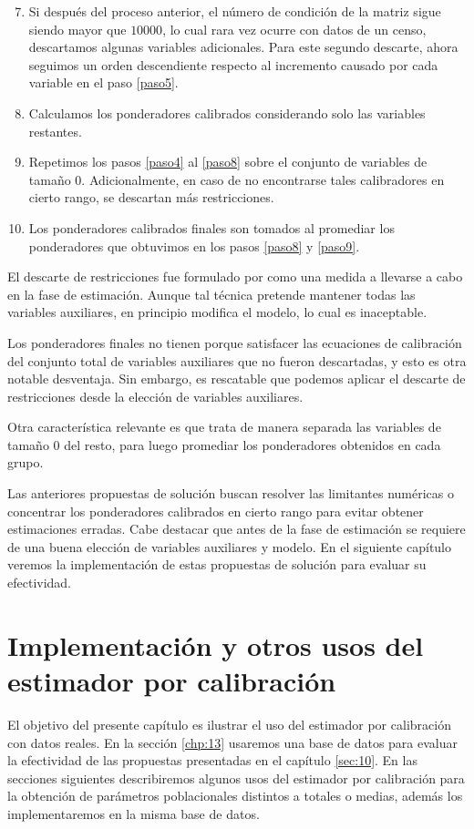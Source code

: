 \documentclass[a4paper,twoside,openright,12pt]{book}
\theoremstyle{definition}
\numberwithin{equation}{chapter}
\numberwithin{figure}{chapter}
\numberwithin{table}{chapter}
\numberwithin{theorem}{chapter}
\numberwithin{lemma}{chapter}
\begin{document}
\begin{enumerate}
\setcounter{enumi}{6}
	\item Si después del proceso anterior, el número de condición de la matriz sigue siendo mayor que $10000$, lo cual rara vez ocurre con datos de un censo, descartamos algunas variables adicionales. Para este segundo descarte, ahora seguimos un orden descendiente respecto al incremento causado por cada variable en el paso \ref{paso5}.
	\item\label{paso8} Calculamos los ponderadores calibrados considerando solo las variables restantes.
	\item\label{paso9} Repetimos los pasos \ref{paso4} al \ref{paso8} sobre el conjunto de variables de tamaño $0$. Adicionalmente, en caso de no encontrarse tales calibradores en cierto rango, se descartan más restricciones.
	\item Los ponderadores calibrados finales son tomados al promediar los ponderadores que obtuvimos en los pasos \ref{paso8} y \ref{paso9}.
\end{enumerate}
El descarte de restricciones fue formulado por \citeauthor{CIS-528372} como una medida a llevarse a cabo en la fase de estimación. Aunque tal técnica pretende mantener todas las variables auxiliares, en principio modifica el modelo, lo cual es inaceptable.

Los ponderadores finales no tienen porque satisfacer las ecuaciones de calibración del conjunto total de variables auxiliares que no fueron descartadas, y esto es otra notable desventaja. Sin embargo, es rescatable que podemos aplicar el descarte de restricciones desde la elección de variables auxiliares.

Otra característica relevante es que trata de manera separada las variables de tamaño $0$ del resto, para luego promediar los ponderadores obtenidos en cada grupo.

Las anteriores propuestas de solución buscan resolver las limitantes numéricas o concentrar los ponderadores calibrados en cierto rango para evitar obtener estimaciones erradas. Cabe destacar que antes de la fase de estimación se requiere de una buena elección de variables auxiliares y modelo. En el siguiente capítulo veremos la implementación de estas propuestas de solución para evaluar su efectividad.
\chapter{Implementación y otros usos del estimador por calibración}\label{chp:4}
El objetivo del presente capítulo es ilustrar el uso del estimador por calibración con datos reales. En la sección \ref{chp:13} usaremos una base de datos para evaluar la efectividad de las propuestas presentadas en el capítulo \ref{sec:10}. En las secciones siguientes describiremos algunos usos del estimador por calibración para la obtención de parámetros poblacionales distintos a totales o medias, además los implementaremos en la misma base de datos.
\end{document}
